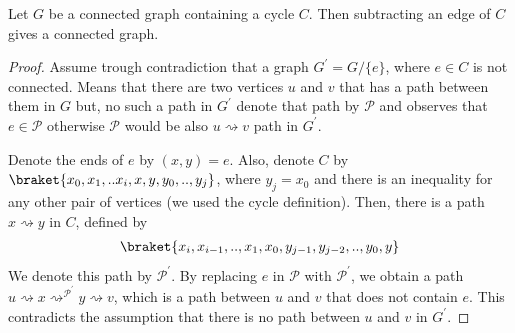 \begin{claim}
  Let $G$ be a connected graph containing a cycle $C$. Then subtracting an edge of $C$ gives a connected graph. 
\end{claim}
\begin{proof}
  Assume trough contradiction that a graph $G^{\prime} = G / \{ e \} $, where $e \in C$ is not connected. Means that there are two vertices $u$ and $v$ that has a path between them in $G$ but, no such a path in $G^{\prime}$ denote that path by $\mathcal{P}$ and observes that $e \in \mathcal{P}$ otherwise $\mathcal{P}$ would be also $u \rightsquigarrow v$ path in $G^{\prime}$. 

Denote the ends of $e$ by $(x,y)=e$. Also, denote $C$ by $\braket{x_{0},x_{1},..x_{i},x,y,y_{0},..,y_{j}}$, where $y_{j}=x_{0}$ and there is an inequality for any other pair of vertices (we used the cycle definition). Then, there is a path $x \rightsquigarrow y$ in $C$, defined by 
\begin{equation*}
  \begin{split}
\braket{x_{i},x_{i-1},..,x_{1},x_{0},y_{j-1},y_{j-2},..,y_{0},y}
  \end{split}
\end{equation*}
 We denote this path by $\mathcal{P}^{\prime}$. By replacing $e$ in $\mathcal{P}$ with $\mathcal{P}^{\prime}$, we obtain a path $u \rightsquigarrow x \rightsquigarrow^{\mathcal{P}^\prime} y \rightsquigarrow v$, which is a path between $u$ and $v$ that does not contain $e$. This contradicts the assumption that there is no path between $u$ and $v$ in $G^{\prime}$.
\end{proof}







